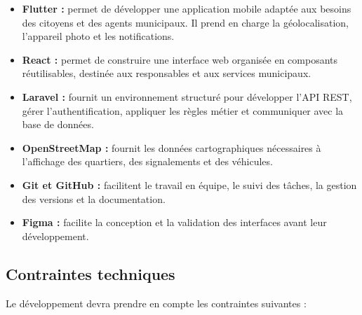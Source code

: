 \documentclass[11pt,a4paper,oneside]{report}
\begin{document}
	\begin{itemize}
		\item \textbf{Flutter :} permet de développer une application
		mobile adaptée aux besoins des citoyens et des agents municipaux.
		Il prend en charge la géolocalisation, l'appareil photo et
		les notifications.
		
		\item \textbf{React :} permet de construire une interface web
		organisée en composants réutilisables, destinée aux responsables
		et aux services municipaux.
		
		\item \textbf{Laravel :} fournit un environnement structuré
		pour développer l'API REST, gérer l'authentification, appliquer
		les règles métier et communiquer avec la base de données.
		
		
		\item \textbf{OpenStreetMap :} fournit les données cartographiques
		nécessaires à l'affichage des quartiers, des signalements
		et des véhicules.
		
		\item \textbf{Git et GitHub :} facilitent le travail en équipe,
		le suivi des tâches, la gestion des versions et la documentation.
		
		\item \textbf{Figma :} facilite la conception et la validation
		des interfaces avant leur développement.
	\end{itemize}
	
	\subsection{Contraintes techniques}
	
	Le développement devra prendre en compte les contraintes suivantes :
	
\end{document}
